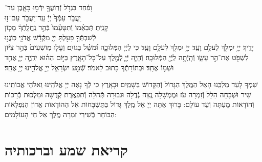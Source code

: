 \documentclass[twoside, openany, parskip=half, 11pt]{book}
\begin{document}
וָפַ֔חַד \hfill בִּגְדֹ֥ל זְֿרֽוֹעֲךָ֖ יִדְּֿמ֣וּ כָּאָ֑בֶן \hfill עַד־\\
יַֽעֲבֹ֤ר עַמְּֿךָ֙ יְיָ֔ \hfill עַֽד־יַֽעֲבֹ֖ר עַם־ז֣וּ \\
קָנִֽיתָ׃ \hfill תְּֿבִאֵ֗מוֹ וְֿתִטָּעֵ֨מוֹ֙ בְּֿהַ֣ר נַֽחֲלָֽתְֿךָ֔ \hfill מָכ֧וֹן \\
לְֿשִׁבְתְּֿךָ֛ פָּעַ֖לְתָּ יְיָ֑ \hfill מִקְּֿדָ֕שׁ אֲדֹנָ֖י כּֽוֹנֲנ֥וּ \\
יָדֶֽיךָ׃ \hfill יְיָ֥ יִמְלֹ֖ךְ לְֿעֹלָ֥ם וָעֶֽד׃\hfill \break
יְיָ֥ יִמְלֹ֖ךְ לְֿעֹלָ֥ם וָעֶֽד׃
כִּי לַיְֿיָ הַמְּֿלוּכָ֑ה וּ֝מֹשֵׁ֗ל בַּגּוֹיִֽם׃
וְֿעָל֤וּ מֽוֹשִׁעִים֙ בְּֿהַ֣ר צִיּ֔וֹן לִשְׁפֹּ֖ט אֶת־הַ֣ר עֵשָׂ֑ו וְֿהָֽיְֿתָ֥ה לַֽיְֿיָ֖ הַמְּֿלוּכָֽה׃
וְֿהָיָ֧ה יְֿיָ֛ לְֿמֶ֖לֶךְ עַל־כׇּל־הָאָ֑רֶץ בַּיּ֣וֹם הַה֗וּא יִֽהְיֶ֧ה יְיָ֛ אֶחָ֖ד וּשְׁמ֥וֹ אֶחָֽד׃
וּבְתוֹרָתְֿךָ כָּתוּב לֵאמֹר׃
שְֿׁמַ֖ע יִשְׂרָאֵ֑ל יְיָ֥ אֱלֹהֵ֖ינוּ יְיָ֥ אֶחָֽד׃



שִׁמְךָ לָעַד מַלְכֵּֽנוּ הָאֵל הַמֶּֽלֶךְ הַגָּדוֹל וְֿהַקָּדוֹשׁ בַּשָׁמַֽיִם וּבָאָֽרֶץ כִּי לְֿךָ נָאֶה יְיָ אֱלֹהֵֽינוּ וֵאלֹהֵי אֲבוֹתֵֽינוּ שִׁיר וּשְׁבָחָה הַלֵּל וְֿזִמְרָה עֹז וּמֶמְשָׁלָה נֶֽצַח גְּֿדֻלָּה וּגְבוּרָה תְּֿהִלָּה וְֿתִפְאֶֽרֶת קְֿדֻשָּׁה וּמַלְכוּת בְּֿרָכוֹת וְֿהוֹדָאוֹת מֵעַתָּה וְֿעַד עוֹלָם: בָּרוּךְ אַתָּה יְיָ אֵל מֶֽלֶךְ גָּדוֹל בַּתֻּשְׁבָּחוֹת אֵל הַהוֹדָאוֹת אֲדוֹן הַנִּפְלָאוֹת הַבּוֹחֵר בְּֿשִׁירֵי זִמְרָה מֶֽלֶךְ אֵל חַי הָעוֹלָמִים:

\halfkaddish

\enlargethispage{\baselineskip}

\vspace{1.25\baselineskip}
{\let\clearpage\relax
\chapter[שחרית לחול]{קריאת שמע וברכותיה}}
\end{document}
